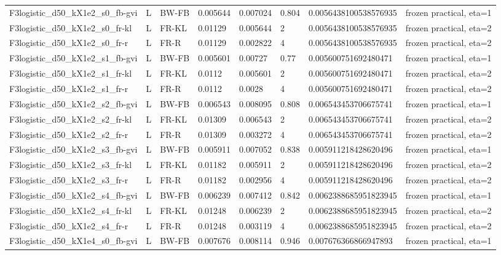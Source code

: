 \begin{tabular}{llllllll}
F3logistic\_d50\_kX1e2\_s0\_fb-gvi & L & BW-FB & 0.005644 & 0.007024 & 0.804 & 0.0056438100538576935 & frozen practical, eta=1 \\
F3logistic\_d50\_kX1e2\_s0\_fr-kl & L & FR-KL & 0.01129 & 0.005644 & 2 & 0.0056438100538576935 & frozen practical, eta=2 \\
F3logistic\_d50\_kX1e2\_s0\_fr-r & L & FR-R & 0.01129 & 0.002822 & 4 & 0.0056438100538576935 & frozen practical, eta=2 \\
F3logistic\_d50\_kX1e2\_s1\_fb-gvi & L & BW-FB & 0.005601 & 0.00727 & 0.77 & 0.005600751692480471 & frozen practical, eta=1 \\
F3logistic\_d50\_kX1e2\_s1\_fr-kl & L & FR-KL & 0.0112 & 0.005601 & 2 & 0.005600751692480471 & frozen practical, eta=2 \\
F3logistic\_d50\_kX1e2\_s1\_fr-r & L & FR-R & 0.0112 & 0.0028 & 4 & 0.005600751692480471 & frozen practical, eta=2 \\
F3logistic\_d50\_kX1e2\_s2\_fb-gvi & L & BW-FB & 0.006543 & 0.008095 & 0.808 & 0.006543453706675741 & frozen practical, eta=1 \\
F3logistic\_d50\_kX1e2\_s2\_fr-kl & L & FR-KL & 0.01309 & 0.006543 & 2 & 0.006543453706675741 & frozen practical, eta=2 \\
F3logistic\_d50\_kX1e2\_s2\_fr-r & L & FR-R & 0.01309 & 0.003272 & 4 & 0.006543453706675741 & frozen practical, eta=2 \\
F3logistic\_d50\_kX1e2\_s3\_fb-gvi & L & BW-FB & 0.005911 & 0.007052 & 0.838 & 0.005911218428620496 & frozen practical, eta=1 \\
F3logistic\_d50\_kX1e2\_s3\_fr-kl & L & FR-KL & 0.01182 & 0.005911 & 2 & 0.005911218428620496 & frozen practical, eta=2 \\
F3logistic\_d50\_kX1e2\_s3\_fr-r & L & FR-R & 0.01182 & 0.002956 & 4 & 0.005911218428620496 & frozen practical, eta=2 \\
F3logistic\_d50\_kX1e2\_s4\_fb-gvi & L & BW-FB & 0.006239 & 0.007412 & 0.842 & 0.0062388685951823945 & frozen practical, eta=1 \\
F3logistic\_d50\_kX1e2\_s4\_fr-kl & L & FR-KL & 0.01248 & 0.006239 & 2 & 0.0062388685951823945 & frozen practical, eta=2 \\
F3logistic\_d50\_kX1e2\_s4\_fr-r & L & FR-R & 0.01248 & 0.003119 & 4 & 0.0062388685951823945 & frozen practical, eta=2 \\
F3logistic\_d50\_kX1e4\_s0\_fb-gvi & L & BW-FB & 0.007676 & 0.008114 & 0.946 & 0.007676366866947893 & frozen practical, eta=1 \\

\end{tabular}
